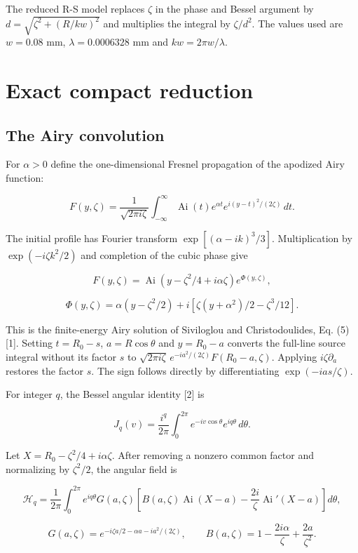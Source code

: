 \documentclass[11pt]{article}
\begin{document}
The reduced R-S model replaces \(\zeta\) in the phase and Bessel
argument by \(d=\sqrt{\zeta^2+(R/kw)^2}\) and multiplies the integral by
\(\zeta/d^2\). The values used are \(w=0.08\) mm, \(\lambda=0.0006328\)
mm and \(kw=2\pi w/\lambda\).

\section{Exact compact reduction}\label{exact-compact-reduction}

\subsection{The Airy convolution}\label{the-airy-convolution}

For \(\alpha>0\) define the one-dimensional Fresnel propagation of the
apodized Airy function:

\[F(y,\zeta)=\frac{1}{\sqrt{2\pi i\zeta}}\int_{-\infty}^{\infty}\operatorname{Ai}(t)e^{\alpha t}e^{i(y-t)^2/(2\zeta)}\,dt.\]

The initial profile has Fourier transform \(\exp[(\alpha-ik)^3/3]\).
Multiplication by \(\exp(-i\zeta k^2/2)\) and completion of the cubic
phase give

\[F(y,\zeta)=\operatorname{Ai}(y-\zeta^2/4+i\alpha\zeta)e^{\Phi(y,\zeta)},\]

\[\Phi(y,\zeta)=\alpha(y-\zeta^2/2)+i[\zeta(y+\alpha^2)/2-\zeta^3/12].\]

This is the finite-energy Airy solution of Siviloglou and
Christodoulides, Eq. (5) {[}1{]}. Setting \(t=R_0-s\), \(a=R\cos\theta\)
and \(y=R_0-a\) converts the full-line source integral without its
factor \(s\) to
\(\sqrt{2\pi i\zeta}\,e^{-ia^2/(2\zeta)}F(R_0-a,\zeta)\). Applying
\(i\zeta\partial_a\) restores the factor \(s\). The sign follows
directly by differentiating \(\exp(-ias/\zeta)\).

For integer \(q\), the Bessel angular identity {[}2{]} is

\[J_q(v)=\frac{i^q}{2\pi}\int_0^{2\pi}e^{-iv\cos\theta}e^{iq\theta}\,d\theta.\]

Let \(X=R_0-\zeta^2/4+i\alpha\zeta\). After removing a nonzero common
factor and normalizing by \(\zeta^2/2\), the angular field is

\[\mathcal H_q=\frac{1}{2\pi}\int_0^{2\pi}e^{iq\theta}G(a,\zeta)\left[B(a,\zeta)\operatorname{Ai}(X-a)-\frac{2i}{\zeta}\operatorname{Ai}'(X-a)\right]d\theta,\]

\[G(a,\zeta)=e^{-i\zeta a/2-\alpha a-ia^2/(2\zeta)},\qquad B(a,\zeta)=1-\frac{2i\alpha}{\zeta}+\frac{2a}{\zeta^2}.\]
\end{document}
